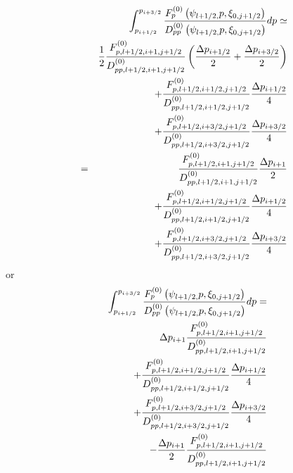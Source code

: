 \begin{eqnarray}
&&\int_{p_{i+1/2}}^{p_{i+3/2}}\frac{F_{p}^{\left( 0\right) }\left( \psi
_{l+1/2,}p,\xi _{0,j+1/2}\right) }{D_{pp}^{\left( 0\right) }\left( \psi
_{l+1/2,}p,\xi _{0,j+1/2}\right) }dp\simeq   \nonumber \\
&&\frac{1}{2}\frac{F_{p,l+1/2,i+1,j+1/2}^{\left( 0\right) }}{%
D_{pp,l+1/2,i+1,j+1/2}^{\left( 0\right) }}\left( \frac{\Delta p_{i+1/2}}{2}+%
\frac{\Delta p_{i+3/2}}{2}\right)   \nonumber \\
&&+\frac{F_{p,l+1/2,i+1/2,j+1/2}^{\left( 0\right) }}{%
D_{pp,l+1/2,i+1/2,j+1/2}^{\left( 0\right) }}\frac{\Delta p_{i+1/2}}{4}
\nonumber \\
&&+\frac{F_{p,l+1/2,i+3/2,j+1/2}^{\left( 0\right) }}{%
D_{pp,l+1/2,i+3/2,j+1/2}^{\left( 0\right) }}\frac{\Delta p_{i+3/2}}{4}
\nonumber \\
&=&\frac{F_{p,l+1/2,i+1,j+1/2}^{\left( 0\right) }}{D_{pp,l+1/2,i+1,j+1/2}^{%
\left( 0\right) }}\frac{\Delta p_{i+1}}{2}  \nonumber \\
&&+\frac{F_{p,l+1/2,i+1/2,j+1/2}^{\left( 0\right) }}{%
D_{pp,l+1/2,i+1/2,j+1/2}^{\left( 0\right) }}\frac{\Delta p_{i+1/2}}{4}
\nonumber \\
&&+\frac{F_{p,l+1/2,i+3/2,j+1/2}^{\left( 0\right) }}{%
D_{pp,l+1/2,i+3/2,j+1/2}^{\left( 0\right) }}\frac{\Delta p_{i+3/2}}{4}
\end{eqnarray}
or
\begin{eqnarray}
&&\int_{p_{i+1/2}}^{p_{i+3/2}}\frac{F_{p}^{\left( 0\right) }\left( \psi
_{l+1/2,}p,\xi _{0,j+1/2}\right) }{D_{pp}^{\left( 0\right) }\left( \psi
_{l+1/2,}p,\xi _{0,j+1/2}\right) }dp=  \nonumber \\
&&\Delta p_{i+1}\frac{F_{p,l+1/2,i+1,j+1/2}^{\left( 0\right) }}{%
D_{pp,l+1/2,i+1,j+1/2}^{\left( 0\right) }}  \nonumber \\
&&+\frac{F_{p,l+1/2,i+1/2,j+1/2}^{\left( 0\right) }}{%
D_{pp,l+1/2,i+1/2,j+1/2}^{\left( 0\right) }}\frac{\Delta p_{i+1/2}}{4}
\nonumber \\
&&+\frac{F_{p,l+1/2,i+3/2,j+1/2}^{\left( 0\right) }}{%
D_{pp,l+1/2,i+3/2,j+1/2}^{\left( 0\right) }}\frac{\Delta p_{i+3/2}}{4}
\nonumber \\
&&-\frac{\Delta p_{i+1}}{2}\frac{F_{p,l+1/2,i+1,j+1/2}^{\left( 0\right) }}{%
D_{pp,l+1/2,i+1,j+1/2}^{\left( 0\right) }}
\end{eqnarray}

